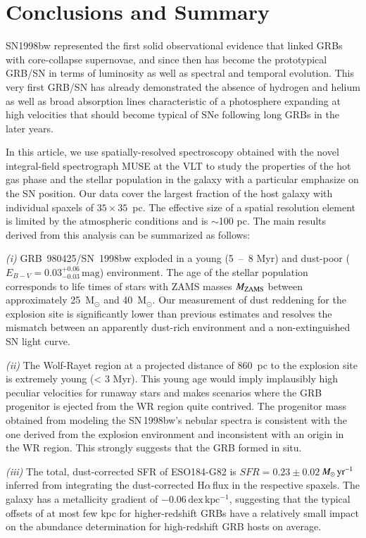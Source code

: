 \documentclass[traditabstract]{aa}
\newcommand{\ha}{H$\alpha$}
\newcommand{\Msunyr}{$M_\odot\,\rm{yr}^{-1}$}
\begin{document}
\section{Conclusions and Summary}

SN1998bw represented the first solid observational evidence that linked GRBs with core-collapse supernovae, and since then has become the prototypical GRB/SN in terms of luminosity as well as spectral and temporal evolution. This very first GRB/SN has already demonstrated the absence of hydrogen and helium as well as broad absorption lines characteristic of a photosphere expanding at high velocities that should become typical of SNe following long GRBs in the later years.

In this article, we use spatially-resolved spectroscopy obtained with the novel integral-field spectrograph MUSE at the VLT to study the properties of the hot gas phase and the stellar population in the galaxy with a particular emphasize on the SN position. Our data cover the largest fraction of the host galaxy with individual spaxels of $35 \times 35$~pc. The effective size of a spatial resolution element is limited by the atmospheric conditions and is $\sim$100 pc. The main results derived from this analysis can be summarized as follows:

\textit{(i)} GRB~980425/SN~1998bw exploded in a young (5~--~8 Myr) and dust-poor ($E_{B-V} = 0.03_{-0.03}^{+0.06}\,\mathrm{mag}$) environment. The age of the stellar population corresponds to life times of stars with ZAMS masses $M_{\rm{ZAMS}}$  between approximately 25~M$_{\odot}$ and 40~M$_{\odot}$. Our measurement of dust reddening for the explosion site is significantly lower than previous estimates and resolves the mismatch between an apparently dust-rich environment and a non-extinguished SN light curve.

\textit{(ii)} The Wolf-Rayet region at a projected distance of 860~pc to the explosion site is extremely young (< 3 Myr). This young age would imply implausibly high peculiar velocities for runaway stars and makes scenarios where the GRB progenitor is ejected from the WR region quite contrived. The progenitor mass obtained from modeling the SN\,1998bw's nebular spectra \citep{2006ApJ...640..854M} is consistent with the one derived from the explosion environment and inconsistent with an origin in the WR region. This strongly suggests that the GRB formed in situ.

\textit{(iii)} The total, dust-corrected SFR of ESO184-G82 is $SFR=0.23\pm0.02$\,\Msunyr inferred from integrating the dust-corrected \ha\,flux in the respective spaxels. The galaxy has a metallicity gradient of $-0.06\,\mathrm{dex\,kpc^{-1}}$, suggesting that the typical offsets of at most few kpc for higher-redshift GRBs have a relatively small impact on the abundance determination for high-redshift GRB hosts on average.
\end{document}
